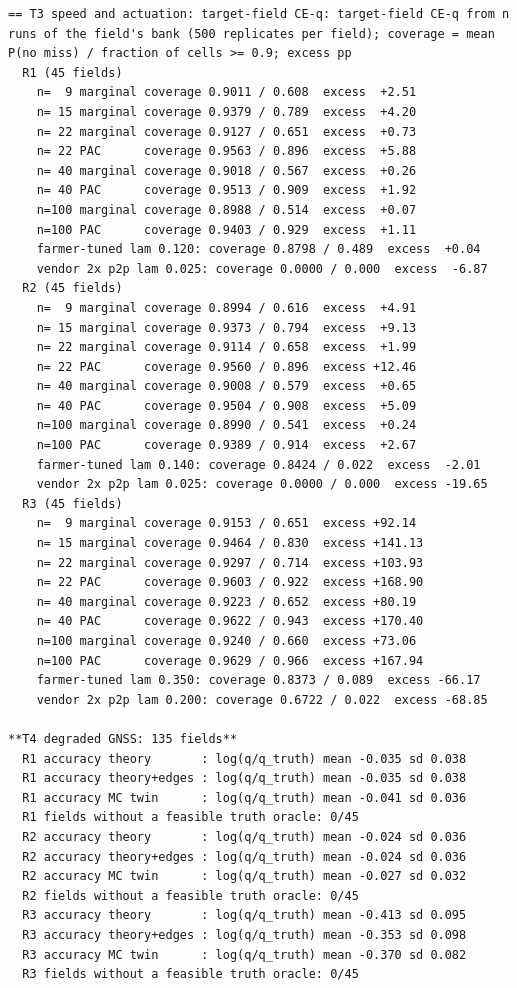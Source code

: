 \documentclass[preprint,12pt,authoryear]{elsarticle}
\begin{document}
\begin{Verbatim}[fontsize=\tiny,breaklines]
== T3 speed and actuation: target-field CE-q: target-field CE-q from n runs of the field's bank (500 replicates per field); coverage = mean P(no miss) / fraction of cells >= 0.9; excess pp
  R1 (45 fields)
    n=  9 marginal coverage 0.9011 / 0.608  excess  +2.51
    n= 15 marginal coverage 0.9379 / 0.789  excess  +4.20
    n= 22 marginal coverage 0.9127 / 0.651  excess  +0.73
    n= 22 PAC      coverage 0.9563 / 0.896  excess  +5.88
    n= 40 marginal coverage 0.9018 / 0.567  excess  +0.26
    n= 40 PAC      coverage 0.9513 / 0.909  excess  +1.92
    n=100 marginal coverage 0.8988 / 0.514  excess  +0.07
    n=100 PAC      coverage 0.9403 / 0.929  excess  +1.11
    farmer-tuned lam 0.120: coverage 0.8798 / 0.489  excess  +0.04
    vendor 2x p2p lam 0.025: coverage 0.0000 / 0.000  excess  -6.87
  R2 (45 fields)
    n=  9 marginal coverage 0.8994 / 0.616  excess  +4.91
    n= 15 marginal coverage 0.9373 / 0.794  excess  +9.13
    n= 22 marginal coverage 0.9114 / 0.658  excess  +1.99
    n= 22 PAC      coverage 0.9560 / 0.896  excess +12.46
    n= 40 marginal coverage 0.9008 / 0.579  excess  +0.65
    n= 40 PAC      coverage 0.9504 / 0.908  excess  +5.09
    n=100 marginal coverage 0.8990 / 0.541  excess  +0.24
    n=100 PAC      coverage 0.9389 / 0.914  excess  +2.67
    farmer-tuned lam 0.140: coverage 0.8424 / 0.022  excess  -2.01
    vendor 2x p2p lam 0.025: coverage 0.0000 / 0.000  excess -19.65
  R3 (45 fields)
    n=  9 marginal coverage 0.9153 / 0.651  excess +92.14
    n= 15 marginal coverage 0.9464 / 0.830  excess +141.13
    n= 22 marginal coverage 0.9297 / 0.714  excess +103.93
    n= 22 PAC      coverage 0.9603 / 0.922  excess +168.90
    n= 40 marginal coverage 0.9223 / 0.652  excess +80.19
    n= 40 PAC      coverage 0.9622 / 0.943  excess +170.40
    n=100 marginal coverage 0.9240 / 0.660  excess +73.06
    n=100 PAC      coverage 0.9629 / 0.966  excess +167.94
    farmer-tuned lam 0.350: coverage 0.8373 / 0.089  excess -66.17
    vendor 2x p2p lam 0.200: coverage 0.6722 / 0.022  excess -68.85

**T4 degraded GNSS: 135 fields**
  R1 accuracy theory       : log(q/q_truth) mean -0.035 sd 0.038
  R1 accuracy theory+edges : log(q/q_truth) mean -0.035 sd 0.038
  R1 accuracy MC twin      : log(q/q_truth) mean -0.041 sd 0.036
  R1 fields without a feasible truth oracle: 0/45
  R2 accuracy theory       : log(q/q_truth) mean -0.024 sd 0.036
  R2 accuracy theory+edges : log(q/q_truth) mean -0.024 sd 0.036
  R2 accuracy MC twin      : log(q/q_truth) mean -0.027 sd 0.032
  R2 fields without a feasible truth oracle: 0/45
  R3 accuracy theory       : log(q/q_truth) mean -0.413 sd 0.095
  R3 accuracy theory+edges : log(q/q_truth) mean -0.353 sd 0.098
  R3 accuracy MC twin      : log(q/q_truth) mean -0.370 sd 0.082
  R3 fields without a feasible truth oracle: 0/45


\end{Verbatim}
\end{document}
